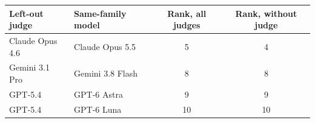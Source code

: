 \begin{tabular}{llcc}
\toprule
Left-out judge & Same-family model & Rank, all judges & Rank, without judge \\
\midrule
Claude Opus 4.6 & Claude Opus 5.5 & 5 & 4 \\
Gemini 3.1 Pro & Gemini 3.8 Flash & 8 & 8 \\
GPT-5.4 & GPT-6 Astra & 9 & 9 \\
GPT-5.4 & GPT-6 Luna & 10 & 10 \\
\bottomrule
\end{tabular}
